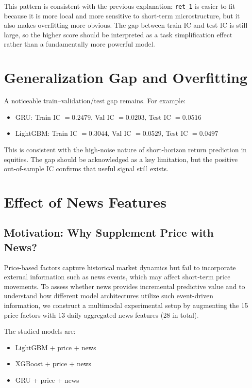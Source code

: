 This pattern is consistent with the previous explanation: \texttt{ret\_1} is easier to fit because it is more local and more sensitive to short-term microstructure, but it also makes overfitting more obvious. The gap between train IC and test IC is still large, so the higher score should be interpreted as a task simplification effect rather than a fundamentally more powerful model.

\section{Generalization Gap and Overfitting}

A noticeable train--validation/test gap remains. For example:
\begin{itemize}
	\item GRU: Train IC $=0.2479$, Val IC $=0.0203$, Test IC $=0.0516$
	\item LightGBM: Train IC $=0.3044$, Val IC $=0.0529$, Test IC $=0.0497$
\end{itemize}
This is consistent with the high-noise nature of short-horizon return prediction in equities. The gap should be acknowledged as a key limitation, but the positive out-of-sample IC confirms that useful signal still exists.

\section{Effect of News Features}

\subsection{Motivation: Why Supplement Price with News?}

Price-based factors capture historical market dynamics but fail to incorporate external information such as news events, which may affect short-term price movements. To assess whether news provides incremental predictive value and to understand how different model architectures utilize such event-driven information, we construct a multimodal experimental setup by augmenting the 15 price factors with 13 daily aggregated news features (28 in total).

The studied models are:
\begin{itemize}
\item LightGBM + price + news
\item XGBoost + price + news
\item GRU + price + news
\end{itemize}

